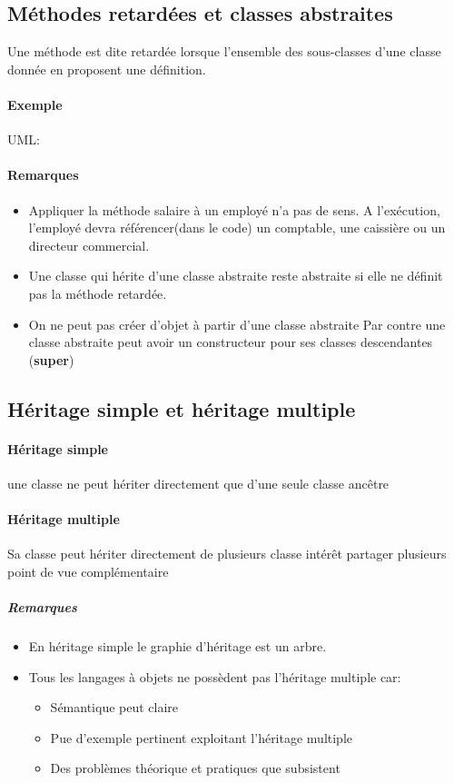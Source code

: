 \subsection{Méthodes retardées et classes abstraites}
Une méthode est dite retardée lorsque l'ensemble des sous-classes d'une classe donnée en 
proposent une définition.
\paragraph{Exemple}UML:  \\


\paragraph{Remarques}
\begin{itemize}
\item Appliquer la méthode salaire à un employé n'a pas de sens.
	A l'exécution, l'employé devra référencer(dans le code) un comptable,
	une caissière ou un directeur commercial.
\item Une classe qui hérite d'une classe abstraite reste abstraite
	si elle ne définit pas la méthode retardée.
\item On ne peut pas créer d'objet à partir d'une classe abstraite
	Par contre une classe abstraite peut avoir un constructeur pour ses
	classes descendantes (\textbf{super}) 
\end{itemize}
\subsection{Héritage simple et héritage multiple}
\paragraph{Héritage simple} une classe ne peut hériter directement que 
d'une seule classe ancêtre
\paragraph{Héritage multiple} Sa classe peut hériter directement de plusieurs classe 
intérêt partager plusieurs point de vue complémentaire\\

	
\subparagraph{Remarques}
\begin{itemize}
\item En héritage simple le graphie d'héritage est un arbre.
\item Tous les langages à objets ne possèdent pas l'héritage multiple car: 
	\begin{itemize}
		\item Sémantique peut claire
		\item Pue d'exemple pertinent exploitant l'héritage multiple
		\item Des problèmes théorique et pratiques que subsistent
	\end{itemize}
\end{itemize}
